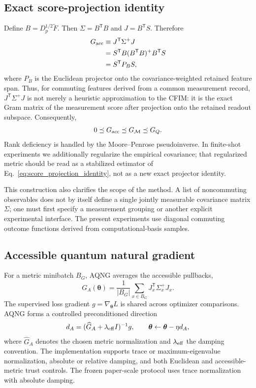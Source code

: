 \subsection{Exact score-projection identity}
Define $B=D_p^{1/2}\widetilde F$. Then $\Sigma=B^{\mathsf T}B$ and $J=B^{\mathsf T}S$. Therefore
\begin{align}
 G_{\rm acc}
 &\equiv J^{\mathsf T}\Sigma^{+}J \\
 &=S^{\mathsf T}B(B^{\mathsf T}B)^{+}B^{\mathsf T}S \\
 &=S^{\mathsf T}P_BS,
 \label{eq:score_projection_identity}
\end{align}
where $P_B$ is the Euclidean projector onto the covariance-weighted retained feature span. Thus, for commuting features derived from a common measurement record, $J^{\mathsf T}\Sigma^{+}J$ is not merely a heuristic approximation to the CFIM: it is the exact Gram matrix of the measurement score after projection onto the retained readout subspace. Consequently,
\begin{equation}
 0\preceq G_{\rm acc}\preceq G_{\mathcal M}\preceq G_Q.
 \label{eq:metric_nesting}
\end{equation}
Rank deficiency is handled by the Moore--Penrose pseudoinverse. In finite-shot experiments we additionally regularize the empirical covariance; that regularized metric should be read as a stabilized estimator of Eq.~\eqref{eq:score_projection_identity}, not as a new exact projector identity.

This construction also clarifies the scope of the method. A list of noncommuting observables does not by itself define a single jointly measurable covariance matrix $\Sigma$; one must first specify a measurement grouping or another explicit experimental interface. The present experiments use diagonal commuting outcome functions derived from computational-basis samples.

\subsection{Accessible quantum natural gradient}
For a metric minibatch $B_G$, AQNG averages the accessible pullbacks,
\begin{equation}
 G_A(\bm\theta)=\frac{1}{|B_G|}\sum_{x\in B_G}J_x^{\mathsf T}\Sigma_x^{+}J_x.
 \label{eq:GA}
\end{equation}
The supervised loss gradient $g=\nabla_{\bm\theta}L$ is shared across optimizer comparisons. AQNG forms a controlled preconditioned direction
\begin{equation}
 d_A=(\widehat G_A+\lambda_{\rm eff}I)^{-1}g,
 \qquad
 \bm\theta\leftarrow\bm\theta-\eta d_A,
 \label{eq:aqng_update}
\end{equation}
where $\widehat G_A$ denotes the chosen metric normalization and $\lambda_{\rm eff}$ the damping convention. The implementation supports trace or maximum-eigenvalue normalization, absolute or relative damping, and both Euclidean and accessible-metric trust controls. The frozen paper-scale protocol uses trace normalization with absolute damping.

